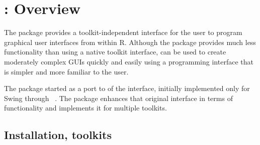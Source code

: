






 
\newcommand{\ONLYIN}[1]{[only in #1]}

\chapter{: Overview}
\label{sec:overview}




The  package provides a toolkit-independent interface
for the \R\/ user to program graphical user interfaces from within
R. Although the package provides much less functionality than using a
native toolkit interface,  can be used to create
moderately complex GUIs quickly and easily using a programming
interface that is simpler and more familiar to the \R\/ user.

 
The  package started as a port to  of the
 interface, initially implemented only for Swing through
~\citep{iWidgets}. The  package enhances that
original interface in terms of functionality and implements it for
multiple toolkits.  

\section{Installation, toolkits}
\label{sec:installation}

